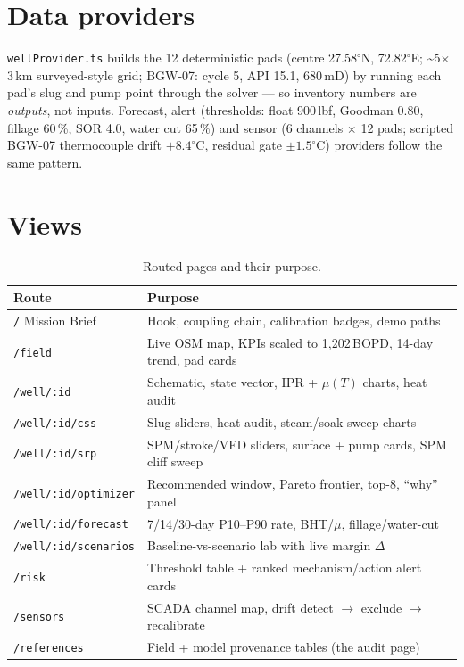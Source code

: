 \documentclass[12pt,a4paper]{report}
\begin{document}
\section{Data providers}
\texttt{wellProvider.ts} builds the 12 deterministic pads (centre
27.58$^\circ$N, 72.82$^\circ$E; \textasciitilde5$\times$3\,km surveyed-style
grid; BGW-07: cycle 5, API 15.1, 680\,mD) by running each pad's slug and pump
point through the solver --- so inventory numbers are \emph{outputs}, not
inputs. Forecast, alert (thresholds: float 900\,lbf, Goodman 0.80, fillage
60\,\%, SOR 4.0, water cut 65\,\%) and sensor (6 channels $\times$ 12 pads;
scripted BGW-07 thermocouple drift $+8.4^\circ$C, residual gate $\pm1.5^\circ$C)
providers follow the same pattern.

\section{Views}
\begin{table}[h]
\centering
\caption{Routed pages and their purpose.\label{tab:pages}}
\begin{tabular}{lp{9.8cm}}
\toprule
\textbf{Route} & \textbf{Purpose} \\ \midrule
\texttt{/} Mission Brief & Hook, coupling chain, calibration badges, demo paths \\
\texttt{/field} & Live OSM map, KPIs scaled to 1,202\,BOPD, 14-day trend, pad cards \\
\texttt{/well/:id} & Schematic, state vector, IPR + $\mu(T)$ charts, heat audit \\
\texttt{/well/:id/css} & Slug sliders, heat audit, steam/soak sweep charts \\
\texttt{/well/:id/srp} & SPM/stroke/VFD sliders, surface + pump cards, SPM cliff sweep \\
\texttt{/well/:id/optimizer} & Recommended window, Pareto frontier, top-8, ``why'' panel \\
\texttt{/well/:id/forecast} & 7/14/30-day P10--P90 rate, BHT/$\mu$, fillage/water-cut \\
\texttt{/well/:id/scenarios} & Baseline-vs-scenario lab with live margin $\Delta$ \\
\texttt{/risk} & Threshold table + ranked mechanism/action alert cards \\
\texttt{/sensors} & SCADA channel map, drift detect $\rightarrow$ exclude $\rightarrow$ recalibrate \\
\texttt{/references} & Field + model provenance tables (the audit page) \\
\bottomrule
\end{tabular}
\end{table}
\end{document}
